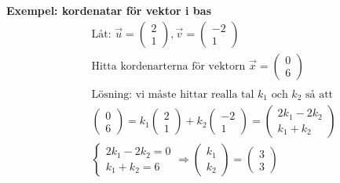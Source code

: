 \begin{multicols}{2}
\textbf{Exempel: kordenatar för vektor i bas}
\begin{align*}
  &\quad \text{Låt: }
  \vec{u}=\begin{pmatrix}  2 \\  1   \end{pmatrix},
  \vec{v}=\begin{pmatrix}  -2 \\  1   \end{pmatrix} \\
  &\quad  \text{Hitta kordenarterna för vektorn }
  \vec{x}=\begin{pmatrix}  0 \\  6   \end{pmatrix} \\
  &\quad \\
  &\quad  \text{Lösning: vi måste hittar realla tal $k_1$ och $k_2$ så att } \\
  &\quad
  \begin{pmatrix}  0 \\  6   \end{pmatrix} =
  k_1\begin{pmatrix}  2 \\  1   \end{pmatrix} 
  +k_2\begin{pmatrix}  -2 \\  1   \end{pmatrix} =
  \begin{pmatrix}  2k_1-2k_2 \\  k_1+k_2   \end{pmatrix} \\
  &\quad 
  \left\{\begin{array}{r}
  2k_1-2k_2 = 0 \\
  k_1+k_2 = 6 
  \end{array}\right. \Rightarrow{}
  \begin{pmatrix}  k_1 \\  k_2   \end{pmatrix} =  \begin{pmatrix}  3 \\  3   \end{pmatrix} \\
\end{align*}



\end{multicols}
